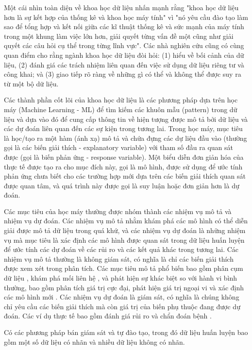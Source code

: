 \documentclass[utf8]{frontiersSCNS} %
\begin{document}
Một cái nhìn toàn diện về khoa học dữ liệu nhấn mạnh rằng "khoa học dữ liệu hơn là sự kết hợp của thống kê và khoa học máy tính" vì "nó yêu cầu đào tạo làm sao để tổng hợp và kết nối giữa các kĩ thuật thống kê và sức mạnh của máy tính trong một khung làm việc lớn hơn, giải quyết từng vấn đề một cũng như giải quyết các câu hỏi cụ thể trong từng lĩnh vực". Các nhà nghiên cứu cũng có cùng quan điểm cho rằng ngành khoa học dữ liệu đòi hỏi: (1) hiểu về bối cảnh của dữ liệu, (2) đánh giá các trách nhiệm liên quan đến việc sử dụng dữ liệu riêng tư và công khai; và (3) giao tiếp rõ ràng về những gì có thể và không thể được suy ra từ một bộ dữ liệu.

Các thành phần cốt lõi của khoa học dữ liệu là các phương pháp dựa trên học máy (Machine Learning - ML) để tìm kiếm các khuôn mẫu (pattern) trong dữ liệu và dựa vào đó để cung cấp thông tin về hiện tượng được mô tả bởi dữ liệu và các dự đoán liên quan đến các sự kiện trong tương lai. Trong học máy, mục tiêu là học/tạo ra một hàm (ánh xạ) mô tả và chứa đựng các dự liệu đầu vào (thường gọi là các biến giải thích - explanatory variable) với tham số đầu ra quan sát được (gọi là biến phản ứng - response variable). Một biểu diễn đơn giản hóa của thực tế được tạo ra cho mục đích này, gọi là mô hình, được sử dụng để ước tính phản ứng chưa biết cho các trường hợp mới dựa trên các biến giải thích quan sát được quan tâm, và quá trình này được gọi là suy luận hoặc đơn giản hơn là dự đoán.

Các mục tiêu của học máy thường được nhóm thành các nhiệm vụ mô tả và nhiệm vụ dự đoán. Các nhiệm vụ mô tả nhằm khám phá các mô hình có thể diễn giải được mô tả dữ liệu trong quá khứ, và các nhiệm vụ dự đoán là những nhiệm vụ mà mục tiêu là xác định các mô hình được quan sát trong dữ liệu huấn luyện để ước tính các dự đoán về các rủi ro và các kết quả khác trong tương lai. Các nhiệm vụ mô tả thường là không giám sát, có nghĩa là chỉ các biến giải thích được xem xét trong phân tích. Các mục tiêu mô tả phổ biến bao gồm phân cụm dữ liệu \citep{Albarakati2019, Gligorijevic2016}, khám phá mối liên hệ \citep{Gligorijevic2016a}, và phát hiện sự khác biệt so với hành vi bình thường, bao gồm phân tích giá trị cực đại, phát hiện giá trị ngoại vi và xác định các mô hình mới \citep{Tan2016}. Các nhiệm vụ dự đoán là giám sát, có nghĩa là chúng không chỉ yêu cầu các biến giải thích mà còn giá trị của biến phụ thuộc đang được dự đoán. Các ví dụ thực tế bao gồm đánh giá rủi ro và chẩn đoán bệnh \citep{Ghalwash2013}.

Có các phương pháp bán giám sát và tự đào tạo, trong đó dữ liệu huấn luyện bao gồm một số dữ liệu có nhãn và nhiều dữ liệu không có nhãn. 
\end{document}

